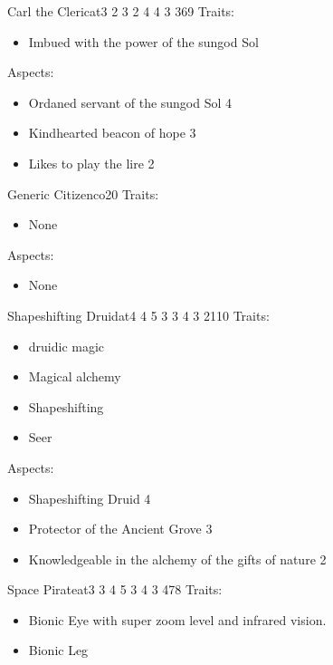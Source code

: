 \documentclass[11pt]{article}
\begin{document}
{\begin{npc}{Carl the Cleric}{at}{3 2 3 2 4 4 3 3}{69}
Traits:
\begin{itemize}
\item Imbued with the power of the sungod Sol
\end{itemize}
\columnbreak

Aspects:
\begin{itemize}
\item Ordaned servant of the sungod Sol 4
\item Kindhearted beacon of hope 3
\item Likes to play the lire 2
\end{itemize}
\end{npc}

\begin{npc}{Generic Citizen}{co}{2}{0}
Traits:
\begin{itemize}
\item None
\end{itemize}

\columnbreak

Aspects:
\begin{itemize}
\item None
\end{itemize}
\end{npc}

\begin{npc}{Shapeshifting Druid}{at}{4 4 5 3 3 4 3 2}{110}
Traits:
\begin{itemize}
\item druidic magic
\item Magical alchemy
\item Shapeshifting
\item Seer
\end{itemize}

\columnbreak

Aspects:
\begin{itemize}
\item Shapeshifting Druid 4
\item Protector of the Ancient Grove 3
\item Knowledgeable in the alchemy of the gifts of nature 2
\end{itemize}
\end{npc}

\begin{npc}{Space Pirate}{at}{3 3 4 5 3 4 3 4}{78}
Traits:
\begin{itemize}
\item Bionic Eye with super zoom level and infrared vision.
\item Bionic Leg
\end{itemize}


\end{npc}}
\end{document}
